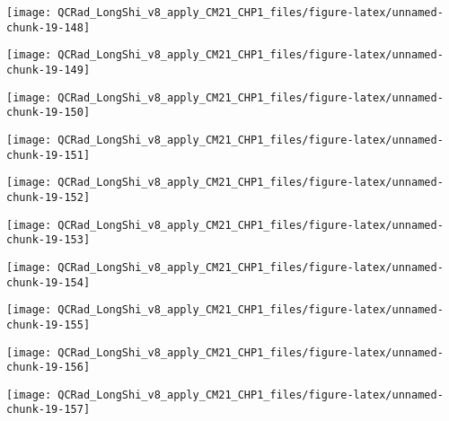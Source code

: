 \documentclass[
  10pt,
  a4paper,oneside]{article}
\begin{document}
\begin{center}\texttt{[image: QCRad\_LongShi\_v8\_apply\_CM21\_CHP1\_files/figure-latex/unnamed-chunk-19-148]} \end{center}

\begin{center}\texttt{[image: QCRad\_LongShi\_v8\_apply\_CM21\_CHP1\_files/figure-latex/unnamed-chunk-19-149]} \end{center}

\begin{center}\texttt{[image: QCRad\_LongShi\_v8\_apply\_CM21\_CHP1\_files/figure-latex/unnamed-chunk-19-150]} \end{center}

\begin{center}\texttt{[image: QCRad\_LongShi\_v8\_apply\_CM21\_CHP1\_files/figure-latex/unnamed-chunk-19-151]} \end{center}

\begin{center}\texttt{[image: QCRad\_LongShi\_v8\_apply\_CM21\_CHP1\_files/figure-latex/unnamed-chunk-19-152]} \end{center}

\begin{center}\texttt{[image: QCRad\_LongShi\_v8\_apply\_CM21\_CHP1\_files/figure-latex/unnamed-chunk-19-153]} \end{center}

\begin{center}\texttt{[image: QCRad\_LongShi\_v8\_apply\_CM21\_CHP1\_files/figure-latex/unnamed-chunk-19-154]} \end{center}

\begin{center}\texttt{[image: QCRad\_LongShi\_v8\_apply\_CM21\_CHP1\_files/figure-latex/unnamed-chunk-19-155]} \end{center}

\begin{center}\texttt{[image: QCRad\_LongShi\_v8\_apply\_CM21\_CHP1\_files/figure-latex/unnamed-chunk-19-156]} \end{center}

\begin{center}\texttt{[image: QCRad\_LongShi\_v8\_apply\_CM21\_CHP1\_files/figure-latex/unnamed-chunk-19-157]} \end{center}
\end{document}
